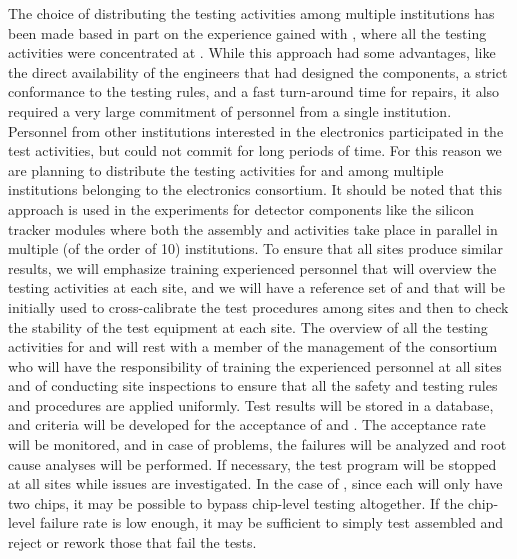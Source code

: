 The choice of distributing the testing activities among multiple
institutions has been made based in part on the experience gained
with , where all the testing activities were concentrated
at . While this approach had some advantages, like the direct availability
of the engineers that had designed the components, a strict conformance
to the testing rules, and a fast turn-around
time for repairs, it also required a very large commitment of
personnel from a single institution. Personnel from other institutions
interested in the  electronics participated in the test
activities, but could not commit for long periods of time. For
this reason we are planning to distribute the  testing
activities for  and  among multiple
institutions belonging to the  electronics consortium.
It should be noted that this approach is used in the 
experiments for detector components like the silicon tracker 
modules where both the assembly and  activities take
place in parallel in multiple (of the order of 10) institutions.
To ensure that all sites produce similar
results, we will emphasize training experienced personnel
that will overview the testing activities at each site,
and we will have a reference set of  and 
that will be initially used to cross-calibrate the
test procedures among sites and then to check the
stability of the test equipment at each site. The overview of
all the testing activities for  and 
will rest with a member of the management of the 
consortium who will have the responsibility of training the
experienced personnel at all sites and of conducting site
inspections to ensure that all the safety and testing rules
and procedures are applied uniformly. Test results will
be stored in a database, and criteria will be developed
for the acceptance of  and . The acceptance rate
will be monitored, and in case of problems,
the failures will be analyzed and root cause analyses
will be performed. If necessary, the test program will be stopped
at all sites while issues are investigated. In the case of ,
since each  will only have two chips, it may be possible to bypass
chip-level testing altogether. If the chip-level failure rate is low enough,
it may be sufficient to simply test assembled  and reject or rework
those that fail the tests.


